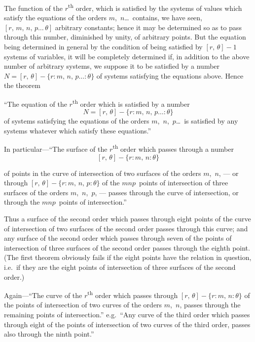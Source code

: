 \documentclass[11pt,a4paper]{article}
\begin{document}
The function of the $r$\textsuperscript{th} order, which is satisfied by the systems of values which satisfy the equations of the orders $m$,~$n$\ldots\ contains, we have seen, $[r,\,m,\,n,\,p\ldots\,\theta]$ arbitrary constants; hence it may be determined so as to pass through this number, diminished by unity, of arbitrary points. But the equation being determined in general by the condition of being satisfied by $[r,\,\theta]-1$ systems of variables, it will be completely determined if, in addition to the above number of arbitrary systems, we suppose it to be satisfied by a number $N = [r,\,\theta] - \{r : m,\, n,\, p\ldots : \theta\}$ of systems satisfying the equations above. Hence the theorem

``The equation of the $r$\textsuperscript{th} order which is satisfied by a number
\[
N = [r,\,\theta] - \{r : m,\, n,\, p\ldots : \theta\}
\]
of systems satisfying the equations of the orders $m$,~$n$,~$p$\ldots\ is satisfied by any systems whatever which satisfy these equations.''

In particular---``The surface of the $r$\textsuperscript{th} order which passes through a number
\[
[r,\,\theta] - \{r : m,\, n : \theta\}
\]

\newpage
of points in the curve of intersection of two surfaces of the orders $m$,~$n$, --- or through $[r,\,\theta] - \{r : m,\, n,\, p : \theta\}$ of the $mnp$~points of intersection of three surfaces of the orders $m$,~$n$,~$p$, --- passes through the curve of intersection, or through the $mnp$~points of intersection.''

Thus a surface of the second order which passes through eight points of the curve of intersection of two surfaces of the second order passes through this curve; and any surface of the second order which passes through seven of the points of intersection of three surfaces of the second order passes through the eighth point. (The first theorem obviously fails if the eight points have the relation in question, i.e.~if they are the eight points of intersection of three surfaces of the second order.)

Again---``The curve of the $r$\textsuperscript{th} order which passes through $[r,\,\theta] - \{r : m,\, n : \theta\}$ of the points of intersection of two curves of the orders $m$,~$n$, passes through the remaining points of intersection.'' e.g.~``Any curve of the third order which passes through eight of the points of intersection of two curves of the third order, passes also through the ninth point.''
\end{document}
